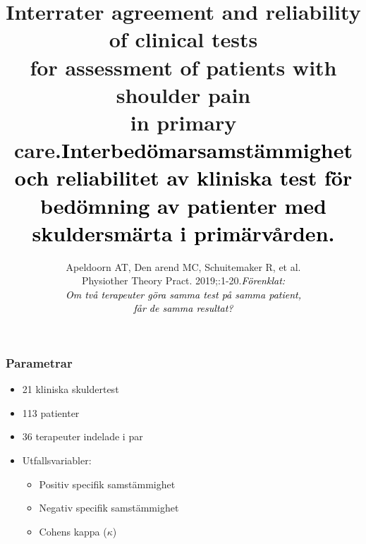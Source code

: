 \documentclass[aspectratio=169,12pt,handout,usenames,dvipsnames]{beamer}
\begin{document}
	\title{Interrater agreement and reliability of clinical tests\\ for assessment of patients with shoulder pain\\ in primary care.}
	\subtitle{Apeldoorn AT, Den arend MC, Schuitemaker R, et al. \\
			  Physiother Theory Pract. 2019;:1-20.}
	\date{}
	\frame[plain]{\maketitle}

\title{\textcolor{black}{Interbedömarsamstämmighet och reliabilitet av kliniska test för bedömning av patienter med skuldersmärta i primärvården.}}

\subtitle{\vspace{5ex}\textcolor{black}{\textit{Förenklat:\\Om två terapeuter göra samma test på samma patient,\\ får de samma resultat?}}}
	\frame[plain]{\maketitle}
	
		\begin{frame}
		\frametitle{Parametrar}
		\begin{itemize}
			\item 21 kliniska skuldertest
			\item 113 patienter
			\item 36 terapeuter indelade i par
			\item Utfallsvariabler:
			\begin{itemize}
				\item Positiv specifik samstämmighet
				\item Negativ specifik samstämmighet
				\item Cohens kappa ($\kappa$)
			\end{itemize}
		\end{itemize}
	\end{frame}
	
\end{document}
